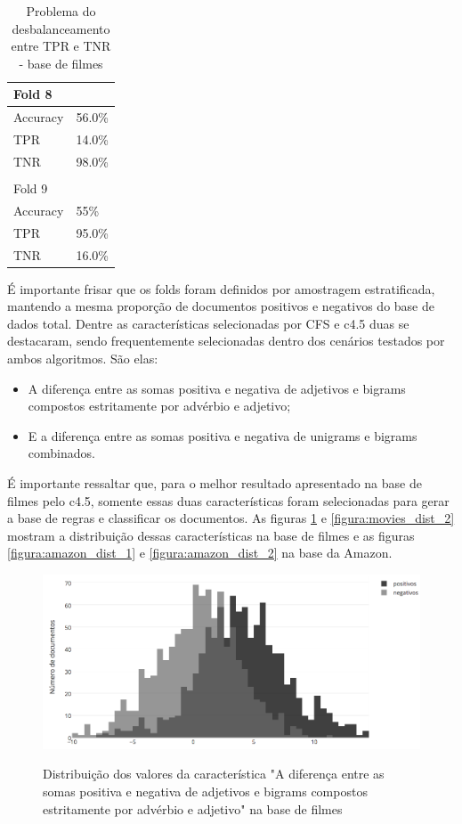 \documentclass[template.tex]{subfiles}
\begin{document}
\begin{table}[H]
\begin{tabular}{ll}
	Fold 8 \\ \hline
    Accuracy &  56.0\% \\
	TPR &  14.0\% \\
	TNR &  98.0\% \\ \\
	
	Fold 9 \\ \hline
    Accuracy &  55\% \\
	TPR &  95.0\% \\
	TNR &  16.0\% \\
    \end{tabular}
    \caption{Problema do desbalanceamento entre TPR e TNR - base de filmes}
    \label{table:movie_folds}
\end{table}

É importante frisar que os folds foram definidos por amostragem estratificada, mantendo a mesma proporção de documentos positivos e negativos do base de dados total. Dentre as características selecionadas por CFS e c4.5 duas se destacaram, sendo frequentemente selecionadas dentro dos cenários testados por ambos algoritmos. São elas:

\begin{itemize}
\item A diferença entre as somas positiva e negativa de adjetivos e bigrams compostos estritamente por advérbio e adjetivo;
\item E a diferença entre as somas positiva e negativa de unigrams e bigrams combinados. 
\end{itemize}

É importante ressaltar que, para o melhor resultado apresentado na base de filmes pelo c4.5, somente essas duas características foram selecionadas para gerar a base de regras e classificar os documentos. As figuras \ref{figura:movies_dist_1} e \ref{figura:movies_dist_2} mostram a distribuição dessas características na base de filmes e as figuras \ref{figura:amazon_dist_1} e \ref{figura:amazon_dist_2} na base da Amazon. 

\begin{figure}[H]
\caption{Distribuição dos valores da característica "A diferença entre as somas positiva e negativa de adjetivos e bigrams compostos estritamente por advérbio e adjetivo" na base de filmes}
\centering
\includegraphics[scale=0.45]{movies_positive_to_negative_ratio_of_adjectives_sum_and_bigrams_with_adjectives}
\label{figura:movies_dist_1}
\end{figure}
\end{document}
